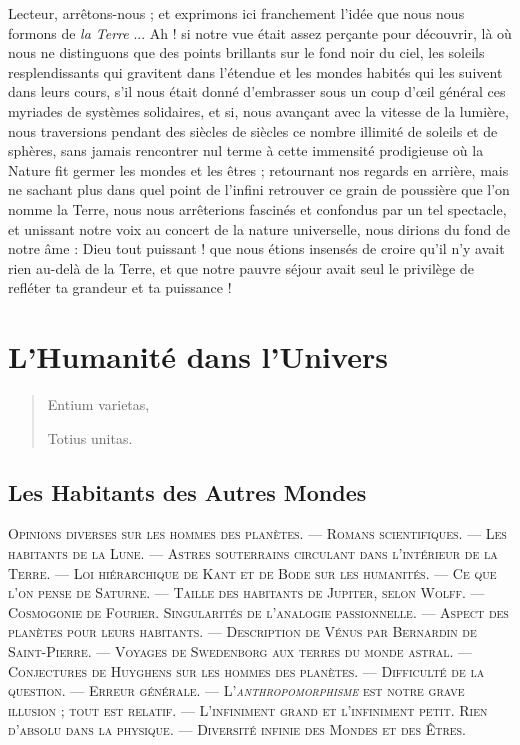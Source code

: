 \documentclass[a4paper, 11pt, oneside]{article}
\begin{document}
Lecteur, arrêtons-nous ; et exprimons ici franchement l'idée que nous nous formons de \emph{la Terre} ... Ah ! si notre vue était assez perçante pour découvrir, là où nous ne distinguons que des points brillants sur le fond noir du ciel, les soleils resplendissants qui gravitent dans l'étendue et les mondes habités qui les suivent dans leurs cours, s'il nous était donné d'embrasser sous un coup d'œil général ces myriades de systèmes solidaires, et si, nous avançant avec la vitesse de la lumière, nous traversions pendant des siècles de siècles ce nombre illimité de soleils et de sphères, sans jamais rencontrer nul terme à cette immensité prodigieuse où la Nature fit germer les mondes et les êtres ; retournant nos regards en arrière, mais ne sachant plus dans quel point de l'infini retrouver ce grain de poussière que l'on nomme la Terre, nous nous arrêterions fascinés et confondus par un tel spectacle, et unissant notre voix au concert de la nature universelle, nous dirions du fond de notre âme : Dieu tout puissant ! que nous étions insensés de croire qu'il n'y avait rien au-delà de la Terre, et que notre pauvre séjour avait seul le privilège de refléter ta grandeur et ta puissance !
\clearpage
\section{L'Humanité dans l'Univers}
\begin{quotation}
Entium varietas,

Totius unitas.
\end{quotation}

\bigskip

\subsection{Les Habitants des Autres Mondes}
\begin{center}
\scshape
\small
Opinions diverses sur les hommes des planètes. --- Romans scientifiques. --- Les habitants de la Lune. --- Astres souterrains circulant dans l'intérieur de la Terre. --- Loi hiérarchique de Kant et de Bode sur les humanités. --- Ce que l'on pense de Saturne. --- Taille des habitants de Jupiter, selon Wolff. --- Cosmogonie de Fourier. Singularités de l'analogie passionnelle. --- Aspect des planètes pour leurs habitants. --- Description de Vénus par Bernardin de Saint-Pierre. --- Voyages de Swedenborg aux terres du monde astral. --- Conjectures de Huyghens sur les hommes des planètes. --- Difficulté de la question. --- Erreur générale. --- L'\emph{anthropomorphisme} est notre grave illusion ; tout est relatif. --- L'infiniment grand et l'infiniment petit. Rien d'absolu dans la physique. --- Diversité infinie des Mondes et des Êtres.
\end{center}
\end{document}
